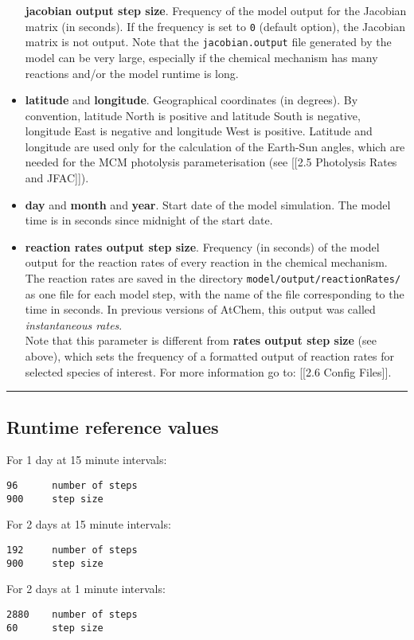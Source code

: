 \begin{itemize}
  \textbf{jacobian output step size}. Frequency of the model output for
  the Jacobian matrix (in seconds). If the frequency is set to
  \texttt{0} (default option), the Jacobian matrix is not output. Note
  that the \texttt{jacobian.output} file generated by the model can be
  very large, especially if the chemical mechanism has many reactions
  and/or the model runtime is long.
\item
  \textbf{latitude} and \textbf{longitude}. Geographical coordinates (in
  degrees). By convention, latitude North is positive and latitude South
  is negative, longitude East is negative and longitude West is
  positive. Latitude and longitude are used only for the calculation of
  the Earth-Sun angles, which are needed for the MCM photolysis
  parameterisation (see {[}{[}2.5 Photolysis Rates and JFAC{]}{]}).
\item
  \textbf{day} and \textbf{month} and \textbf{year}. Start date of the
  model simulation. The model time is in seconds since midnight of the
  start date.
\item
  \textbf{reaction rates output step size}. Frequency (in seconds) of
  the model output for the reaction rates of every reaction in the
  chemical mechanism. The reaction rates are saved in the directory
  \texttt{model/output/reactionRates/} as one file for each model step,
  with the name of the file corresponding to the time in seconds. In
  previous versions of AtChem, this output was called
  \emph{instantaneous rates}.\\
  Note that this parameter is different from \textbf{rates output step
  size} (see above), which sets the frequency of a formatted output of
  reaction rates for selected species of interest. For more information
  go to: {[}{[}2.6 Config Files{]}{]}.
\end{itemize}

\begin{center}\rule{0.5\linewidth}{\linethickness}\end{center}

\hypertarget{runtime-reference-values}{%
\subsection{Runtime reference values}\label{runtime-reference-values}}

For 1 day at 15 minute intervals:

\begin{verbatim}
96      number of steps
900     step size
\end{verbatim}

For 2 days at 15 minute intervals:

\begin{verbatim}
192     number of steps
900     step size
\end{verbatim}

For 2 days at 1 minute intervals:

\begin{verbatim}
2880    number of steps
60      step size
\end{verbatim}
